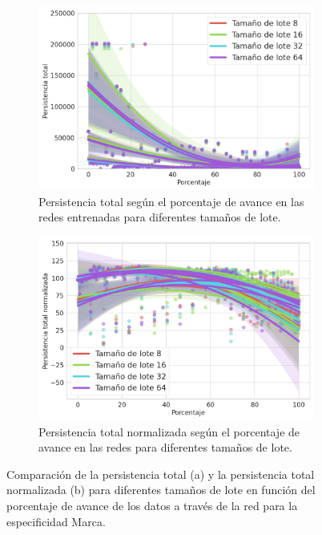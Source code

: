\begin{figure}[H]
	\centering
	\begin{subfigure}
		{.5\textwidth}
		\centering
		\includegraphics[width=\linewidth]{img/m_batch.png}
		\caption{Persistencia total según el porcentaje de avance en las redes
			entrenadas para diferentes tamaños de lote.}
		\label{fig:m-homology-batch-1}
	\end{subfigure}%
	\begin{subfigure}
		{.5\textwidth}
		\centering
		\includegraphics[width=\linewidth]{img/m_batch_norm.png}
		\caption{Persistencia total normalizada según el porcentaje de avance en las
			redes para diferentes tamaños de lote.}
		\label{fig:m-homology-batch-2}
	\end{subfigure}
	\caption{Comparación de la persistencia total (a) y la persistencia total
		normalizada (b) para diferentes tamaños de lote en función del porcentaje de
		avance de los datos a través de la red para la especificidad Marca.}
	\label{fig:m-homology-batch}
\end{figure}

